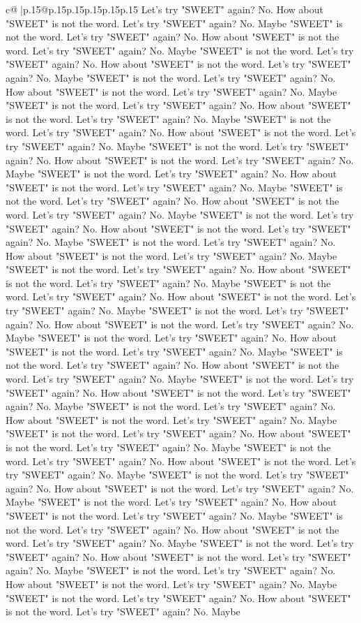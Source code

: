 \documentclass{article}
\begin{document}
{\begin{supertabular}{c@{$\;$}|p{.15\linewidth}@{}p{.15\linewidth}p{.15\linewidth}p{.15\linewidth}p{.15\linewidth}p{.15\linewidth}}
{{{Let's try "SWEET" again? No. How about "SWEET" is not the word. Let's try "SWEET" again? No. Maybe "SWEET" is not the word. Let's try "SWEET" again? No. How about "SWEET" is not the word. Let's try "SWEET" again? No. Maybe "SWEET" is not the word. Let's try "SWEET" again? No. How about "SWEET" is not the word. Let's try "SWEET" again? No. Maybe "SWEET" is not the word. Let's try "SWEET" again? No. How about "SWEET" is not the word. Let's try "SWEET" again? No. Maybe "SWEET" is not the word. Let's try "SWEET" again? No. How about "SWEET" is not the word. Let's try "SWEET" again? No. Maybe "SWEET" is not the word. Let's try "SWEET" again? No. How about "SWEET" is not the word. Let's try "SWEET" again? No. Maybe "SWEET" is not the word. Let's try "SWEET" again? No. How about "SWEET" is not the word. Let's try "SWEET" again? No. Maybe "SWEET" is not the word. Let's try "SWEET" again? No. How about "SWEET" is not the word. Let's try "SWEET" again? No. Maybe "SWEET" is not the word. Let's try "SWEET" again? No. How about "SWEET" is not the word. Let's try "SWEET" again? No. Maybe "SWEET" is not the word. Let's try "SWEET" again? No. How about "SWEET" is not the word. Let's try "SWEET" again? No. Maybe "SWEET" is not the word. Let's try "SWEET" again? No. How about "SWEET" is not the word. Let's try "SWEET" again? No. Maybe "SWEET" is not the word. Let's try "SWEET" again? No. How about "SWEET" is not the word. Let's try "SWEET" again? No. Maybe "SWEET" is not the word. Let's try "SWEET" again? No. How about "SWEET" is not the word. Let's try "SWEET" again? No. Maybe "SWEET" is not the word. Let's try "SWEET" again? No. How about "SWEET" is not the word. Let's try "SWEET" again? No. Maybe "SWEET" is not the word. Let's try "SWEET" again? No. How about "SWEET" is not the word. Let's try "SWEET" again? No. Maybe "SWEET" is not the word. Let's try "SWEET" again? No. How about "SWEET" is not the word. Let's try "SWEET" again? No. Maybe "SWEET" is not the word. Let's try "SWEET" again? No. How about "SWEET" is not the word. Let's try "SWEET" again? No. Maybe "SWEET" is not the word. Let's try "SWEET" again? No. How about "SWEET" is not the word. Let's try "SWEET" again? No. Maybe "SWEET" is not the word. Let's try "SWEET" again? No. How about "SWEET" is not the word. Let's try "SWEET" again? No. Maybe "SWEET" is not the word. Let's try "SWEET" again? No. How about "SWEET" is not the word. Let's try "SWEET" again? No. Maybe "SWEET" is not the word. Let's try "SWEET" again? No. How about "SWEET" is not the word. Let's try "SWEET" again? No. Maybe "SWEET" is not the word. Let's try "SWEET" again? No. How about "SWEET" is not the word. Let's try "SWEET" again? No. Maybe "SWEET" is not the word. Let's try "SWEET" again? No. How about "SWEET" is not the word. Let's try "SWEET" again? No. Maybe "SWEET" is not the word. Let's try "SWEET" again? No. How about "SWEET" is not the word. Let's try "SWEET" again? No. Maybe "SWEET" is not the word. Let's try "SWEET" again? No. How about "SWEET" is not the word. Let's try "SWEET" again? No. Maybe "SWEET" is not the word. Let's try "SWEET" again? No. How about "SWEET" is not the word. Let's try "SWEET" again? No. Maybe }}}
\end{supertabular}}
\end{document}
